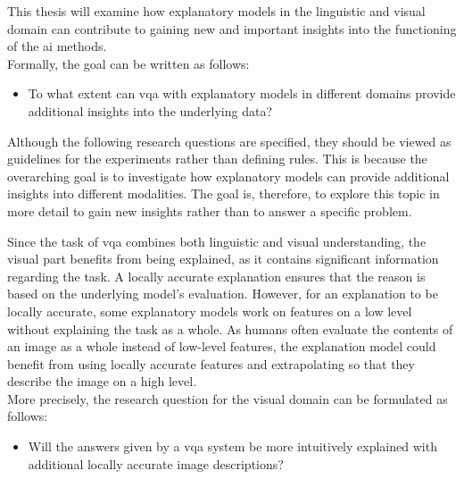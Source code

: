     

This thesis will examine how explanatory models in the linguistic and visual domain can contribute to gaining new and important insights into the functioning of the \gls{ai} methods.\\
Formally, the goal can be written as follows:
\begin{itemize}
    \item To what extent can \gls{vqa} with explanatory models in different domains provide additional insights into the underlying data?
\end{itemize}

Although the following research questions are specified, they should be viewed as guidelines for the experiments rather than defining rules. 
This is because the overarching goal is to investigate how explanatory models can provide additional insights into different modalities. The goal is, therefore, to explore this topic in more detail to gain new insights rather than to answer a specific problem.


Since the task of \gls{vqa} combines both linguistic and visual understanding, the visual part benefits from being explained, as it contains significant information regarding the task. 
A locally accurate explanation ensures that the reason is based on the underlying model's evaluation.
However, for an explanation to be locally accurate, some explanatory models work on features on a low level without explaining the task as a whole. 
As humans often evaluate the contents of an image as a whole instead of low-level features, the explanation model could benefit from using locally accurate features and extrapolating so that they describe the image on a high level.\\
More precisely, the research question for the visual domain can be formulated as follows:

\begin{itemize}
    \item Will the answers given by a \gls{vqa} system be more intuitively explained with additional locally accurate image descriptions?
\end{itemize}

